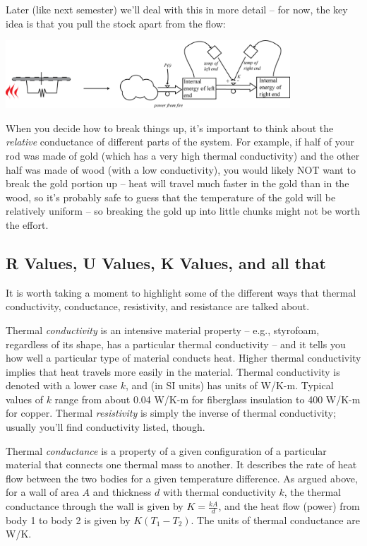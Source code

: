 Later (like next semester) we'll deal with this in more detail -- for now, the key idea is that you pull the stock apart from the flow:


\beforefig
 \centerline{\includegraphics[height=1in]{figs/RodStockAndFlow}}
\afterfig

When you decide how to break things up, it's important to think about the {\it relative} conductance of different parts of the system.  For example, if half of your rod was made of gold (which has a very high thermal conductivity) and the other half was made of wood (with a low conductivity), you would likely NOT want to break the gold portion up -- heat will travel much faster in the gold than in the wood, so it's probably safe to guess that the temperature of the gold will be relatively uniform -- so breaking the gold up into little chunks might not be worth the effort. 

\subsection{R Values, U Values, K Values, and all that}
It is worth taking a moment to highlight some of the different ways that thermal conductivity, conductance, resistivity, and resistance are talked about.

Thermal {\it conductivity} is an intensive material property -- e.g., styrofoam, regardless of its shape, has a particular thermal conductivity -- and it tells you how well a particular type of material conducts heat.  Higher thermal conductivity implies that heat travels more easily in the material.  Thermal conductivity is denoted with a lower case $k$, and (in SI units) has units of W/K-m.  Typical values of $k$ range from about 0.04 W/K-m for fiberglass insulation to 400 W/K-m for copper.
Thermal {\it resistivity} is simply the inverse of thermal conductivity; usually you'll find conductivity listed, though.

Thermal {\it conductance} is a property of a given configuration of a particular material that connects one thermal mass to another.  It describes the rate of heat flow between the two bodies for a given temperature difference.  As argued above, for a wall of area $A$ and thickness $d$ with thermal conductivity $k$, the thermal conductance through the wall is given by $K = \frac{kA}{d}$, and the heat flow (power) from body 1 to body 2 is given by $K(T_1-T_2)$.  The units of thermal conductance are W/K.

